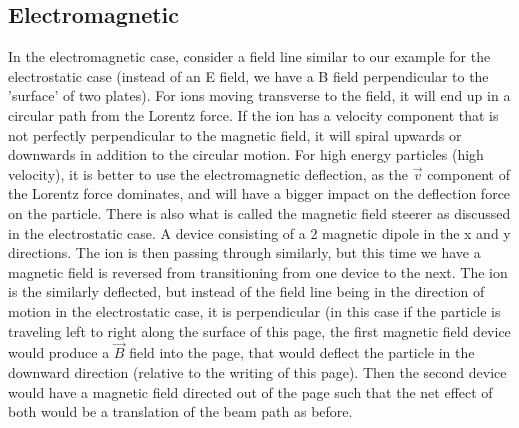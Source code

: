 \subsection{Electromagnetic}\label{subsec:electromagnetic}

In the electromagnetic case, consider a field line similar to our example for the electrostatic case (instead of an E field, we have a B field perpendicular to the 'surface' of two plates).
For ions moving transverse to the field, it will end up in a circular path from the Lorentz force.
If the ion has a velocity component that is not perfectly perpendicular to the magnetic field, it will spiral upwards or downwards in addition to the circular motion.
For high energy particles (high velocity), it is better to use the electromagnetic deflection, as the $\vec{v}$ component of the Lorentz force dominates, and will have a bigger impact on the deflection force on the particle.
There is also what is called the magnetic field steerer as discussed in the electrostatic case.
A device consisting of a 2 magnetic dipole  in the x and y directions.
The ion is then passing through similarly, but this time we have a magnetic field is reversed from transitioning from one device to the next.
The ion is the similarly deflected, but instead of the field line being in the direction of motion in the electrostatic case, it is perpendicular (in this case if the particle is traveling left to right along the surface of this page, the first magnetic field device would produce a $\vec{B}$ field into the page, that would deflect the particle in the downward direction (relative to the writing of this page).
Then the second device would have a magnetic field directed out of the page such that the net effect of both would be a translation of the beam path as before.

